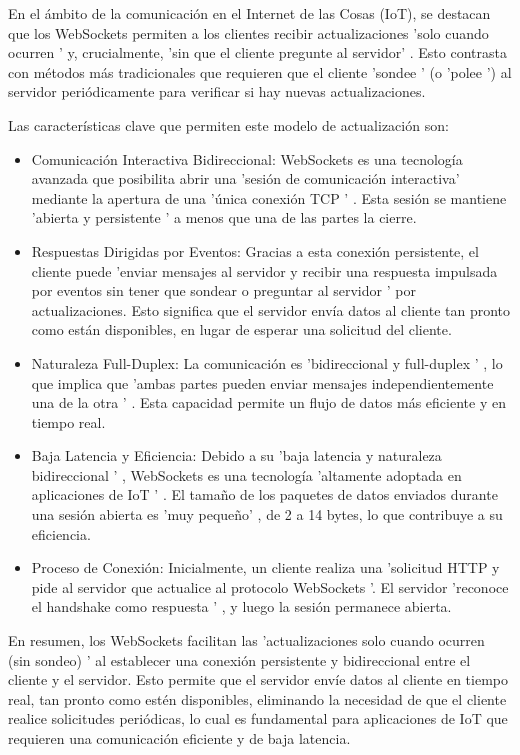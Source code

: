 \documentclass{report}
\begin{document}
En el ámbito de la comunicación en el Internet de las Cosas (IoT), se  destacan que los  WebSockets  permiten a los clientes recibir 
actualizaciones   'solo cuando ocurren '  y, crucialmente,   'sin que el cliente pregunte al servidor' . Esto contrasta con métodos más tradicionales 
que requieren que el cliente  'sondee ' (o  'polee ') al servidor periódicamente para verificar si hay nuevas actualizaciones.

Las características clave que permiten este modelo de actualización son:
\begin{itemize}
    \item Comunicación Interactiva Bidireccional:  WebSockets es una tecnología avanzada que posibilita abrir una   'sesión de comunicación 
    interactiva'  mediante la apertura de una   'única conexión TCP ' . Esta sesión se mantiene   'abierta y persistente '  a menos que una 
    de las partes la cierre.
    \item Respuestas Dirigidas por Eventos:  Gracias a esta conexión persistente, el cliente puede   'enviar mensajes al servidor y recibir una 
    respuesta impulsada por eventos sin tener que sondear o preguntar al servidor '  por actualizaciones. Esto significa que el servidor envía datos 
    al cliente tan pronto como están disponibles, en lugar de esperar una solicitud del cliente.
    \item Naturaleza Full-Duplex:  La comunicación es   'bidireccional y full-duplex ' , lo que implica que   'ambas partes pueden enviar mensajes 
    independientemente una de la otra ' . Esta capacidad permite un flujo de datos más eficiente y en tiempo real.
    \item Baja Latencia y Eficiencia:  Debido a su   'baja latencia y naturaleza bidireccional ' , WebSockets es una tecnología  'altamente adoptada 
    en aplicaciones de IoT ' . El tamaño de los paquetes de datos enviados durante una sesión abierta es   'muy pequeño' , 
    de 2 a 14 bytes, lo que contribuye a su eficiencia.
    \item Proceso de Conexión:  Inicialmente, un cliente realiza una   'solicitud HTTP y pide al servidor que actualice al protocolo WebSockets '. 
    El servidor   'reconoce el handshake como respuesta ' , y luego la sesión permanece abierta.
\end{itemize}
En resumen, los  WebSockets  facilitan las   'actualizaciones solo cuando ocurren (sin sondeo) '  al establecer una conexión 
persistente y bidireccional entre el cliente y el servidor. Esto permite que el servidor envíe datos al cliente en tiempo real, 
tan pronto como estén disponibles, eliminando la necesidad de que el cliente realice solicitudes periódicas, lo cual es 
fundamental para aplicaciones de IoT que requieren una comunicación eficiente y de baja latencia.
\end{document}
